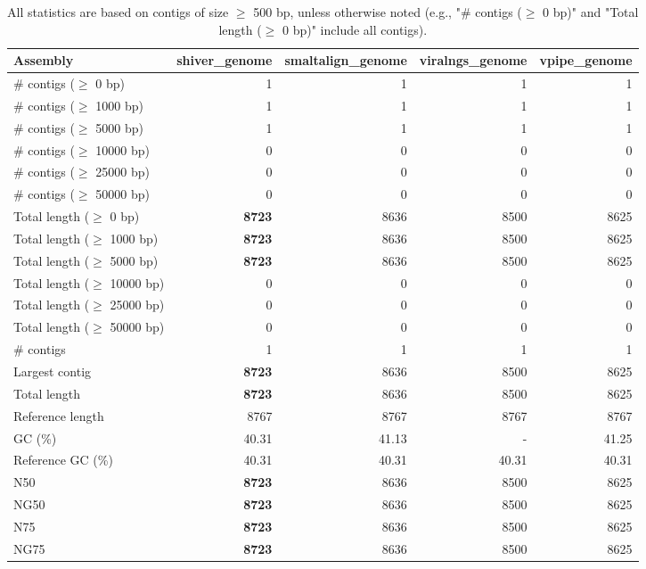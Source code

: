 \documentclass[12pt,a4paper]{article}
\begin{document}
\begin{table}[ht]
\begin{center}
\caption{All statistics are based on contigs of size $\geq$ 500 bp, unless otherwise noted (e.g., "\# contigs ($\geq$ 0 bp)" and "Total length ($\geq$ 0 bp)" include all contigs).}
\begin{tabular}{|l*{4}{|r}|}
\hline
Assembly & shiver\_genome & smaltalign\_genome & viralngs\_genome & vpipe\_genome \\ \hline
\# contigs ($\geq$ 0 bp) & 1 & 1 & 1 & 1 \\ \hline
\# contigs ($\geq$ 1000 bp) & 1 & 1 & 1 & 1 \\ \hline
\# contigs ($\geq$ 5000 bp) & 1 & 1 & 1 & 1 \\ \hline
\# contigs ($\geq$ 10000 bp) & 0 & 0 & 0 & 0 \\ \hline
\# contigs ($\geq$ 25000 bp) & 0 & 0 & 0 & 0 \\ \hline
\# contigs ($\geq$ 50000 bp) & 0 & 0 & 0 & 0 \\ \hline
Total length ($\geq$ 0 bp) & {\bf 8723} & 8636 & 8500 & 8625 \\ \hline
Total length ($\geq$ 1000 bp) & {\bf 8723} & 8636 & 8500 & 8625 \\ \hline
Total length ($\geq$ 5000 bp) & {\bf 8723} & 8636 & 8500 & 8625 \\ \hline
Total length ($\geq$ 10000 bp) & 0 & 0 & 0 & 0 \\ \hline
Total length ($\geq$ 25000 bp) & 0 & 0 & 0 & 0 \\ \hline
Total length ($\geq$ 50000 bp) & 0 & 0 & 0 & 0 \\ \hline
\# contigs & 1 & 1 & 1 & 1 \\ \hline
Largest contig & {\bf 8723} & 8636 & 8500 & 8625 \\ \hline
Total length & {\bf 8723} & 8636 & 8500 & 8625 \\ \hline
Reference length & 8767 & 8767 & 8767 & 8767 \\ \hline
GC (\%) & 40.31 & 41.13 & - & 41.25 \\ \hline
Reference GC (\%) & 40.31 & 40.31 & 40.31 & 40.31 \\ \hline
N50 & {\bf 8723} & 8636 & 8500 & 8625 \\ \hline
NG50 & {\bf 8723} & 8636 & 8500 & 8625 \\ \hline
N75 & {\bf 8723} & 8636 & 8500 & 8625 \\ \hline
NG75 & {\bf 8723} & 8636 & 8500 & 8625 \\ \hline

\end{tabular}
\end{center}
\end{table}
\end{document}
